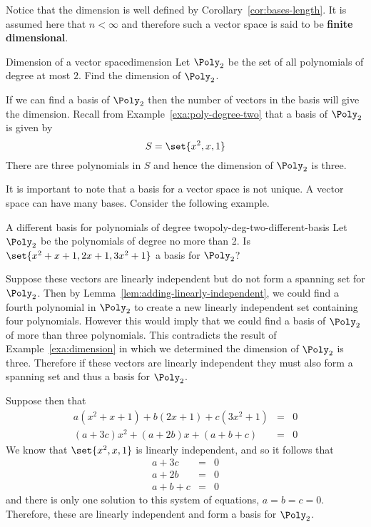 Notice that the dimension is well defined by Corollary~\ref{cor:bases-length}. It is assumed here
that $n<\infty $ and therefore such a vector space is said to be \textbf{finite
dimensional}.

\begin{example}{Dimension of a vector space}{dimension}
Let $\Poly_2$ be the set of all polynomials of degree at most $2$. Find the dimension of $\Poly_2$.
\end{example}

\begin{solution}
If we can find a basis of $\Poly_2$ then the number of vectors in the basis will give the dimension. Recall from Example~\ref{exa:poly-degree-two} that a basis of $\Poly_2$ is given by
\[
S  = \set{x^2, x, 1 }
\]
There are three polynomials in $S$ and hence the dimension of $\Poly_2$ is three.
\end{solution}

It is important to note that a basis for a vector space is not unique. A vector space can have many bases. Consider the following example.

\begin{example}{A different basis for polynomials of degree two}{poly-deg-two-different-basis}
Let $\Poly_2$ be the polynomials of degree no more than 2. Is $\set{
x^{2}+x+1,2x+1,3x^{2}+1} $ a basis for $\Poly_2$?
\end{example}

\begin{solution}
Suppose these vectors are linearly independent but do not form a spanning set for $\Poly_2$. Then by Lemma~\ref{lem:adding-linearly-independent}, we could find a fourth polynomial in $\Poly_2$ to create a new linearly independent
set containing four polynomials. However this would imply that we could find a basis of $\Poly_2$ of more than three polynomials. This contradicts the result of Example~\ref{exa:dimension} in which we determined the dimension of $\Poly_2$ is three.  Therefore if these vectors are linearly independent they must also form a spanning set and thus a basis for $\Poly_2$.

Suppose then that
\begin{eqnarray*}
a(x^{2}+x+1) +b(2x+1) +c(3x^{2}+1) &=& 0\\
(a+3c) x^{2}+(a+2b) x+(a+b+c) &=& 0
\end{eqnarray*}
We know that $\set{x^2, x, 1 }$ is linearly independent, and so it follows that
\begin{eqnarray*}
a+3c &=& 0 \\
a+2b &=& 0 \\
a+b+c &=& 0
\end{eqnarray*}
and there is only one solution to this system of equations, $a=b=c=0$.
Therefore, these are linearly independent and form a basis for $\Poly_2$.
\end{solution}

